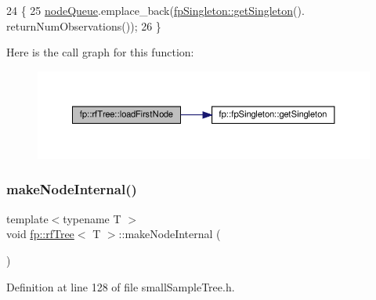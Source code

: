 \begin{DoxyCode}
24                                     \{
25                     \hyperlink{classfp_1_1rfTree_af72d0a2f930fd480dfb4858885c2df23}{nodeQueue}.emplace\_back(\hyperlink{classfp_1_1fpSingleton_a8bdae77b68521003e3fc630edec2e240}{fpSingleton::getSingleton}().
      returnNumObservations());
26                 \}
\end{DoxyCode}
Here is the call graph for this function\+:
\nopagebreak
\begin{figure}[H]
\begin{center}
\leavevmode
\includegraphics[width=350pt]{classfp_1_1rfTree_a8757adc28b68d0a99f95b8bc5d6a38db_cgraph}
\end{center}
\end{figure}
\mbox{\label{classfp_1_1rfTree_aaf7bbdde5f7313c3e84853bbf5fdf792}} 
\subsubsection{\texorpdfstring{make\+Node\+Internal()}{makeNodeInternal()}\hspace{0.1cm}{\footnotesize\ttfamily [1/2]}}
{\footnotesize\ttfamily template$<$typename T $>$ \\
void \hyperlink{classfp_1_1rfTree}{fp\+::rf\+Tree}$<$ T $>$\+::make\+Node\+Internal (\begin{DoxyParamCaption}{ }\end{DoxyParamCaption})\hspace{0.3cm}{\ttfamily [inline]}}



Definition at line 128 of file small\+Sample\+Tree.\+h.


